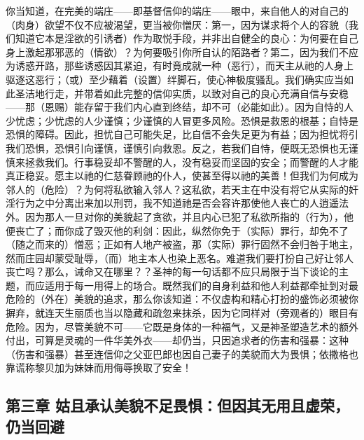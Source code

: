 你当知道，在完美的端庄——即基督信仰的端庄——眼中，来自他人的对自己的（肉身）欲望不仅不应被渴望，更当被你憎厌：第一，因为谋求将个人的容貌（我们知道它本是淫欲的引诱者）作为取悦手段，并非出自健全的良心：为何要在自己身上激起那邪恶的（情欲）？为何要吸引你所自认的陌路者？第二，因为我们不应为诱惑开路，那些诱惑因其紧迫，有时竟成就一种（恶行），而天主从祂的人身上驱逐这恶行；（或）至少藉着（设置）绊脚石，使心神极度骚乱。我们确实应当如此圣洁地行走，并带着如此完整的信仰实质，以致对自己的良心充满自信与安稳——那（恩赐）能存留于我们内心直到终结，却不可（必能如此）。因为自恃的人少忧虑；少忧虑的人少谨慎；少谨慎的人冒更多风险。恐惧是救恩的根基；自恃是恐惧的障碍。因此，担忧自己可能失足，比自信不会失足更为有益；因为担忧将引我们恐惧，恐惧引向谨慎，谨慎引向救恩。反之，若我们自恃，便既无恐惧也无谨慎来拯救我们。行事稳妥却不警醒的人，没有稳妥而坚固的安全；而警醒的人才能真正稳妥。愿主以祂的仁慈眷顾祂的仆人，使甚至得以祂的美善！但我们为何成为邻人的（危险）？为何将私欲输入邻人？这私欲，若天主在中没有将它从实际的奸淫行为之中分离出来加以刑罚，我不知道祂是否会容许那使他人丧亡的人逍遥法外。因为那人一旦对你的美貌起了贪欲，并且内心已犯了私欲所指的（行为），他便丧亡了；而你成了毁灭他的利剑：因此，纵然你免于（实际）罪行，却免不了（随之而来的）憎恶；正如有人地产被盗，那（实际）罪行固然不会归咎于地主，然而庄园却蒙受耻辱，（而）地主本人也染上恶名。难道我们要打扮自己好让邻人丧亡吗？那么，诫命又在哪里？？圣神的每一句话都不应只局限于当下谈论的主题，而应适用于每一用得上的场合。既然我们的自身利益和他人利益都牵扯到对最危险的（外在）美貌的追求，那么你该知道：不仅虚构和精心打扮的盛饰必须被你摒弃，就连天生丽质也当以隐藏和疏忽来抹杀，因为它同样对（旁观者的）眼目有危险。因为，尽管美貌不可——它既是身体的一种福气，又是神圣塑造艺术的额外付出，可算是灵魂的一件华美外衣——却仍当，只因追求者的伤害和强暴：这种（伤害和强暴）甚至连信仰之父亚巴郎也因自己妻子的美貌而大为畏惧；依撒格也靠谎称黎贝加为妹妹而用侮辱换取了安全！\par


\subsection{第三章 姑且承认美貌不足畏惧：但因其无用且虚荣，仍当回避}

